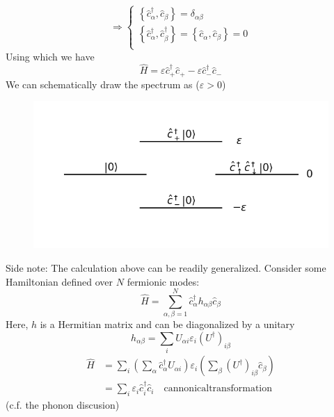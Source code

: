 \[ \Rightarrow \begin{cases}
	\left\{ \hat{c}_{\alpha}^{\dagger},\hat{c}_{\beta} \right\} =\delta _{\alpha \beta}\\
	\left\{ \hat{c}_{\alpha}^{\dagger},\hat{c}_{\beta}^{\dagger} \right\} =\left\{ \hat{c}_{\alpha},\hat{c}_{\beta} \right\} =0\\
\end{cases}\]
Using which we have
\[ \hat{H}=\varepsilon \hat{c}_{+}^{\dagger}\hat{c}_+-\varepsilon \hat{c}_{-}^{\dagger}\hat{c}_-\]
We can schematically draw the spectrum as ($\varepsilon>0$)
\begin{figure}[ht]
    \centering
    \includegraphics[width=\textwidth]{jupyterbook/data/fig/lec04-fig01.png}
\end{figure}

Side note: The calculation above can be readily generalized. Consider some Hamiltonian defined over $N$ fermionic modes:
\[ \hat{H}=\sum_{\alpha ,\beta =1}^N{\hat{c}_{\alpha}^{\dagger}h_{\alpha \beta}\hat{c}_{\beta}}\]
Here, $h$ is a Hermitian matrix and can be diagonalized by a unitary
\[ h_{\alpha \beta}=\sum_i{U_{\alpha i}\varepsilon _i\left( U^{\dagger} \right) _{i\beta}}\]
\begin{align*}
    \hat{H}&=\sum_i{\left( \sum_{\alpha}{\hat{c}_{\alpha}^{\dagger}}U_{\alpha i} \right) \varepsilon _i\left( \sum_{\beta}{\left( U^{\dagger} \right) _{i\beta}\hat{c}_{\beta}} \right)}\\
    &=\sum_i{\varepsilon _i\hat{c}_{i}^{\dagger}\hat{c}_i}\quad \mathrm{cannonical transformation}
\end{align*}
(c.f. the phonon discusion)

